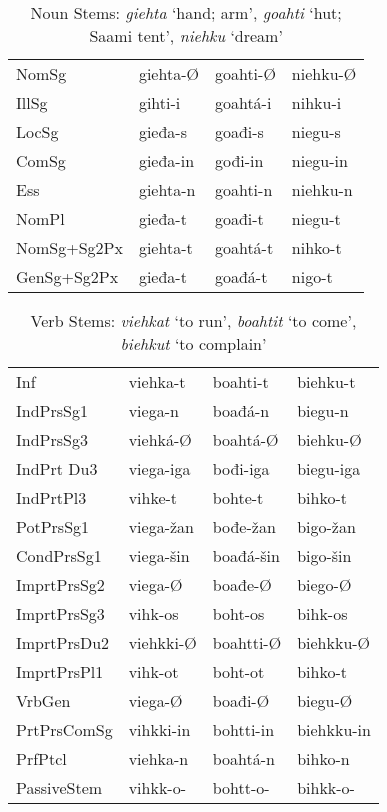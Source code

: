 \documentclass[a4paper,english]{article}
\begin{document}
\begin{table}[htdp]
\caption{Noun Stems: \emph{giehta} ‘hand; arm’, \emph{goahti} ‘hut; Saami tent’, \emph{niehku} ‘dream’}
\begin{center}
\begin{tabular}{llll}
NomSg & giehta-Ø & goahti-Ø & niehku-Ø \\ 
IllSg & gihti-i & goahtá-i & nihku-i \\ 
LocSg & gieđa-s & goađi-s & niegu-s \\ 
ComSg & gieđa-in & gođi-in & niegu-in \\ 
Ess & giehta-n & goahti-n & niehku-n \\ 
NomPl & gieđa-t & goađi-t & niegu-t \\ 
NomSg+Sg2Px & giehta-t & goahtá-t & nihko-t \\ 
GenSg+Sg2Px & gieđa-t & goađá-t & nigo-t
\end{tabular}
\end{center}
\label{nstems}
\end{table}%

\begin{table}[htdp]
\caption{Verb Stems: \emph{viehkat} ‘to run’, \emph{boahtit} ‘to come’, \emph{biehkut} ‘to complain’}
\begin{center}
\begin{tabular}{llll}
Inf & viehka-t & boahti-t & biehku-t \\ 
IndPrsSg1 & viega-n & boađá-n & biegu-n \\ 
IndPrsSg3 & viehká-Ø & boahtá-Ø & biehku-Ø \\ 
IndPrt Du3 & viega-iga & bođi-iga & biegu-iga \\ 
IndPrtPl3 & vihke-t & bohte-t & bihko-t \\ 
PotPrsSg1 & viega-žan & bođe-žan & bigo-žan \\ 
CondPrsSg1 & viega-šin & boađá-šin & bigo-šin \\ 
ImprtPrsSg2 & viega-Ø & boađe-Ø & biego-Ø \\ 
ImprtPrsSg3 & vihk-os & boht-os & bihk-os \\ 
ImprtPrsDu2 & viehkki-Ø & boahtti-Ø & biehkku-Ø \\ 
ImprtPrsPl1 & vihk-ot & boht-ot & bihko-t \\ 
VrbGen & viega-Ø & boađi-Ø & biegu-Ø \\ 
PrtPrsComSg & vihkki-in & bohtti-in & biehkku-in \\ 
PrfPtcl & viehka-n & boahtá-n & bihko-n \\ 
PassiveStem & vihkk-o- & bohtt-o- & bihkk-o-
\end{tabular}
\end{center}
\label{vstems}
\end{table}%
\end{document}

